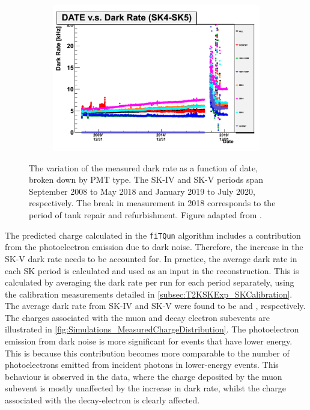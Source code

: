 \begin{figure}[h]
  \begin{subfigure}[t]{\textwidth}
    \includegraphics[width=\textwidth, trim={0mm 0mm 0mm 0mm}, clip, page=1]{Figures/Simulations/DarkRate.pdf}
  \end{subfigure}
  \caption{The variation of the measured dark rate as a function of date, broken down by PMT type. The SK-IV and SK-V periods span September 2008 to May 2018 and January 2019 to July 2020, respectively. The break in measurement in 2018 corresponds to the period of tank repair and refurbishment. Figure adapted from \cite{t2k_tn_399}.}
  \label{fig:Simulations_DarkRateVariation}
\end{figure}

The predicted charge calculated in the \texttt{fiTQun} algorithm includes a contribution from the photoelectron emission due to dark noise. Therefore, the increase in the SK-V dark rate needs to be accounted for. In practice, the average dark rate in each SK period is calculated and used as an input in the reconstruction. This is calculated by averaging the dark rate per run for each period separately, using the calibration measurements detailed in \autoref{subsec:T2KSKExp_SKCalibration}. The average dark rate from SK-IV and SK-V were found to be  and , respectively. The charges associated with the muon and decay electron subevents are illustrated in \autoref{fig:Simulations_MeasuredChargeDistribution}. The photoelectron emission from dark noise is more significant for events that have lower energy. This is because this contribution becomes more comparable to the number of photoelectrons emitted from incident photons in lower-energy events. This behaviour is observed in the data, where the charge deposited by the muon subevent is mostly unaffected by the increase in dark rate, whilst the charge associated with the decay-electron is clearly affected.

